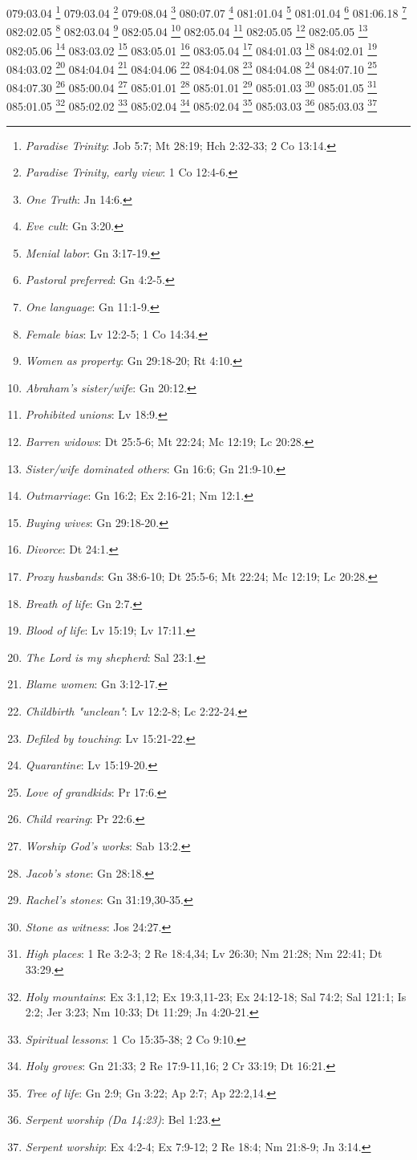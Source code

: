079:03.04 \footnote{\textit{Paradise Trinity}: Job 5:7; Mt 28:19; Hch 2:32-33; 2 Co 13:14.}
079:03.04 \footnote{\textit{Paradise Trinity, early view}: 1 Co 12:4-6.}
079:08.04 \footnote{\textit{One Truth}: Jn 14:6.}
080:07.07 \footnote{\textit{Eve cult}: Gn 3:20.}
081:01.04 \footnote{\textit{Menial labor}: Gn 3:17-19.}
081:01.04 \footnote{\textit{Pastoral preferred}: Gn 4:2-5.}
081:06.18 \footnote{\textit{One language}: Gn 11:1-9.}
082:02.05 \footnote{\textit{Female bias}: Lv 12:2-5; 1 Co 14:34.}
082:03.04 \footnote{\textit{Women as property}: Gn 29:18-20; Rt 4:10.}
082:05.04 \footnote{\textit{Abraham's sister/wife}: Gn 20:12.}
082:05.04 \footnote{\textit{Prohibited unions}: Lv 18:9.}
082:05.05 \footnote{\textit{Barren widows}: Dt 25:5-6; Mt 22:24; Mc 12:19; Lc 20:28.}
082:05.05 \footnote{\textit{Sister/wife dominated others}: Gn 16:6; Gn 21:9-10.}
082:05.06 \footnote{\textit{Outmarriage}: Gn 16:2; Ex 2:16-21; Nm 12:1.}
083:03.02 \footnote{\textit{Buying wives}: Gn 29:18-20.}
083:05.01 \footnote{\textit{Divorce}: Dt 24:1.}
083:05.04 \footnote{\textit{Proxy husbands}: Gn 38:6-10; Dt 25:5-6; Mt 22:24; Mc 12:19; Lc 20:28.}
084:01.03 \footnote{\textit{Breath of life}: Gn 2:7.}
084:02.01 \footnote{\textit{Blood of life}: Lv 15:19; Lv 17:11.}
084:03.02 \footnote{\textit{The Lord is my shepherd}: Sal 23:1.}
084:04.04 \footnote{\textit{Blame women}: Gn 3:12-17.}
084:04.06 \footnote{\textit{Childbirth "unclean"}: Lv 12:2-8; Lc 2:22-24.}
084:04.08 \footnote{\textit{Defiled by touching}: Lv 15:21-22.}
084:04.08 \footnote{\textit{Quarantine}: Lv 15:19-20.}
084:07.10 \footnote{\textit{Love of grandkids}: Pr 17:6.}
084:07.30 \footnote{\textit{Child rearing}: Pr 22:6.}
085:00.04 \footnote{\textit{Worship God's works}: Sab 13:2.}
085:01.01 \footnote{\textit{Jacob's stone}: Gn 28:18.}
085:01.01 \footnote{\textit{Rachel's stones}: Gn 31:19,30-35.}
085:01.03 \footnote{\textit{Stone as witness}: Jos 24:27.}
085:01.05 \footnote{\textit{High places}: 1 Re 3:2-3; 2 Re 18:4,34; Lv 26:30; Nm 21:28; Nm 22:41; Dt 33:29.}
085:01.05 \footnote{\textit{Holy mountains}: Ex 3:1,12; Ex 19:3,11-23; Ex 24:12-18; Sal 74:2; Sal 121:1; Is 2:2; Jer 3:23; Nm 10:33; Dt 11:29; Jn 4:20-21.}
085:02.02 \footnote{\textit{Spiritual lessons}: 1 Co 15:35-38; 2 Co 9:10.}
085:02.04 \footnote{\textit{Holy groves}: Gn 21:33; 2 Re 17:9-11,16; 2 Cr 33:19; Dt 16:21.}
085:02.04 \footnote{\textit{Tree of life}: Gn 2:9; Gn 3:22; Ap 2:7; Ap 22:2,14.}
085:03.03 \footnote{\textit{Serpent worship (Da 14:23)}: Bel 1:23.}
085:03.03 \footnote{\textit{Serpent worship}: Ex 4:2-4; Ex 7:9-12; 2 Re 18:4; Nm 21:8-9; Jn 3:14.}
